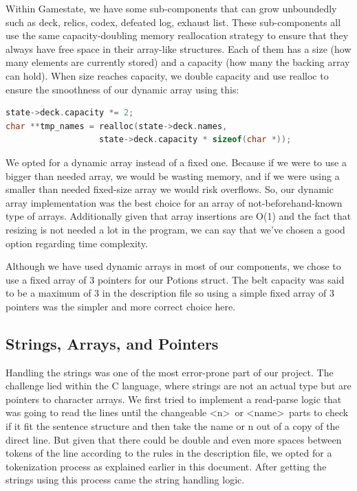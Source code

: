\documentclass[12pt,a4paper]{article}
\begin{document}
Within Gamestate, we have some sub-components that can grow unboundedly such as deck, relics, codex, defeated log, exhaust list. These sub-components all use the same capacity-doubling memory reallocation strategy to ensure that they always have free space in their array-like structures. Each of them has a size (how many elements are currently stored) and a capacity (how many the backing array can hold). When size reaches capacity, we double capacity and use realloc to ensure the smoothness of our dynamic array using this:

\begin{lstlisting}[language=C]
state->deck.capacity *= 2;
char **tmp_names = realloc(state->deck.names, 
                   state->deck.capacity * sizeof(char *));
\end{lstlisting}

We opted for a dynamic array instead of a fixed one. Because if we were to use a bigger than needed array, we would be wasting memory, and if we were using a smaller than needed fixed-size array we would risk overflows. So, our dynamic array implementation was the best choice for an array of not-beforehand-known type of arrays. Additionally given that array insertions are O(1) and the fact that resizing is not needed a lot in the program, we can say that we've chosen a good option regarding time complexity.

Although we have used dynamic arrays in most of our components, we chose to use a fixed array of 3 pointers for our Potions struct. The belt capacity was said to be a maximum of 3 in the description file so using a simple fixed array of 3 pointers was the simpler and more correct choice here.

\subsection{Strings, Arrays, and Pointers}

Handling the strings was one of the most error-prone part of our project. The challenge lied within the C language, where strings are not an actual type but are pointers to character arrays. We first tried to implement a read-parse logic that was going to read the lines until the changeable \textless n\textgreater\ or \textless name\textgreater\ parts to check if it fit the sentence structure and then take the name or n out of a copy of the direct line. But given that there could be double and even more spaces between tokens of the line according to the rules in the description file, we opted for a tokenization process as explained earlier in this document. After getting the strings using this process came the string handling logic.
\end{document}
